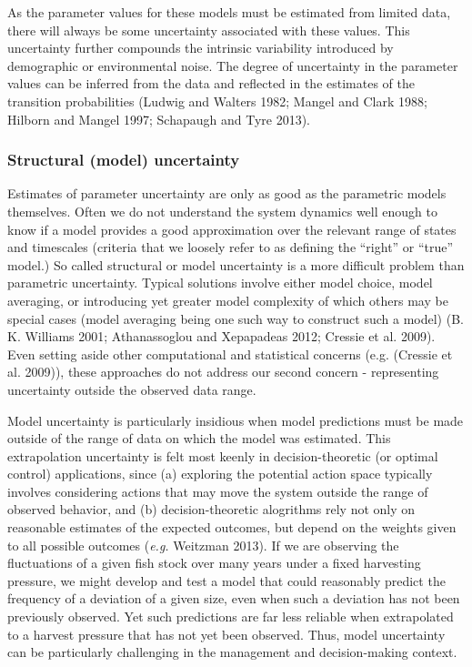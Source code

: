\documentclass[author-year, review]{elsarticle} %
\begin{document}
As the parameter values for these models must be estimated from limited
data, there will always be some uncertainty associated with these
values. This uncertainty further compounds the intrinsic variability
introduced by demographic or environmental noise. The degree of
uncertainty in the parameter values can be inferred from the data and
reflected in the estimates of the transition probabilities (Ludwig and
Walters 1982; Mangel and Clark 1988; Hilborn and Mangel 1997; Schapaugh
and Tyre 2013).

\subsubsection{Structural (model)
uncertainty}\label{structural-model-uncertainty}

Estimates of parameter uncertainty are only as good as the parametric
models themselves. Often we do not understand the system dynamics well
enough to know if a model provides a good approximation over the
relevant range of states and timescales (criteria that we loosely refer
to as defining the ``right'' or ``true'' model.) So called structural or
model uncertainty is a more difficult problem than parametric
uncertainty. Typical solutions involve either model choice, model
averaging, or introducing yet greater model complexity of which others
may be special cases (model averaging being one such way to construct
such a model) (B. K. Williams 2001; Athanassoglou and Xepapadeas 2012;
Cressie et al. 2009). Even setting aside other computational and
statistical concerns (e.g. (Cressie et al. 2009)), these approaches do
not address our second concern - representing uncertainty outside the
observed data range.

Model uncertainty is particularly insidious when model predictions must
be made outside of the range of data on which the model was estimated.
This extrapolation uncertainty is felt most keenly in decision-theoretic
(or optimal control) applications, since (a) exploring the potential
action space typically involves considering actions that may move the
system outside the range of observed behavior, and (b)
decision-theoretic alogrithms rely not only on reasonable estimates of
the expected outcomes, but depend on the weights given to all possible
outcomes (\emph{e.g.} Weitzman 2013). If we are observing the
fluctuations of a given fish stock over many years under a fixed
harvesting pressure, we might develop and test a model that could
reasonably predict the frequency of a deviation of a given size, even
when such a deviation has not been previously observed. Yet such
predictions are far less reliable when extrapolated to a harvest
pressure that has not yet been observed. Thus, model uncertainty can be
particularly challenging in the management and decision-making context.
\end{document}
